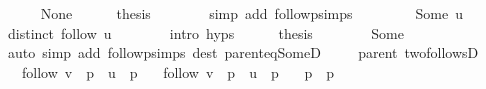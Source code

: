 \begin{isabellebody}
\ \ \ \ \isamarkupfalse%
\ None\isanewline
\ \ \ \ \isamarkupfalse%
\ {\isacharquery}{\kern0pt}thesis\isanewline
\ \ \ \ \ \ \isamarkupfalse%
\ {\isacharparenleft}{\kern0pt}simp\ add{\isacharcolon}{\kern0pt}\ follow{\isacharunderscore}{\kern0pt}psimps{\isacharparenright}{\kern0pt}\isanewline
\ \ \isamarkupfalse%
\isanewline
\ \ \ \ \isamarkupfalse%
\ {\isacharparenleft}{\kern0pt}Some\ u{\isacharparenright}{\kern0pt}\isanewline
\ \ \ \ \isamarkupfalse%
\ {\isachardoublequoteopen}distinct\ {\isacharparenleft}{\kern0pt}follow\ u{\isacharparenright}{\kern0pt}{\isachardoublequoteclose}\isanewline
\ \ \ \ \ \ \isamarkupfalse%
\ {\isacharparenleft}{\kern0pt}intro\ {\isachardoublequoteopen}{}{\isachardot}{\kern0pt}hyps{\isachardoublequoteclose}{\isacharparenright}{\kern0pt}\isanewline
\ \ \ \ \isamarkupfalse%
\ {\isacharquery}{\kern0pt}thesis\isanewline
\ \ \ \ \ \ \isamarkupfalse%
\ Some\isanewline
\ \ \ \ \ \ \isamarkupfalse%
\ {\isacharparenleft}{\kern0pt}auto\ simp\ add{\isacharcolon}{\kern0pt}\ follow{\isacharunderscore}{\kern0pt}psimps\ dest{\isacharcolon}{\kern0pt}\ parent{\isacharunderscore}{\kern0pt}eq{\isacharunderscore}{\kern0pt}SomeD{\isacharparenright}{\kern0pt}\isanewline
\ \ \isamarkupfalse%
\isanewline
{}\isamarkupfalse%
%
\endisatagproof
{\isafoldproof}%
%
\isadelimproof
\isanewline
%
\endisadelimproof
%
\isadeliminvisible
\isanewline
%
\endisadeliminvisible
%
\isataginvisible
{}\isamarkupfalse%
\ {\isacharparenleft}{\kern0pt}\ parent{\isacharparenright}{\kern0pt}\ two{\isacharunderscore}{\kern0pt}followsD{\isacharcolon}{\kern0pt}\isanewline
\ \ \ {\isachardoublequoteopen}follow\ v{}\ {\isacharequal}{\kern0pt}\ p{}\ {\isacharat}{\kern0pt}\ u\ {\isacharhash}{\kern0pt}\ p{}{\isacharprime}{\kern0pt}{\isachardoublequoteclose}\isanewline
\ \ \ {\isachardoublequoteopen}follow\ v{}\ {\isacharequal}{\kern0pt}\ p{}\ {\isacharat}{\kern0pt}\ u\ {\isacharhash}{\kern0pt}\ p{}{\isacharprime}{\kern0pt}{\isachardoublequoteclose}\isanewline
\ \ \ {\isachardoublequoteopen}p{}{\isacharprime}{\kern0pt}\ {\isacharequal}{\kern0pt}\ p{}{\isacharprime}{\kern0pt}{\isachardoublequoteclose}%
\endisataginvisible
{\isafoldinvisible}%
%
\isadeliminvisible
\isanewline
%
\endisadeliminvisible

\end{isabellebody}

